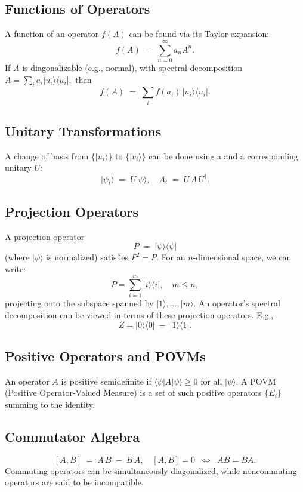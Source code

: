 \documentclass{article}
\begin{document}
\subsection{Functions of Operators}
A function of an operator \(f(A)\) can be found via its Taylor expansion:
\[
f(A) \;=\; \sum_{n=0}^\infty a_n A^n.
\]
If \(A\) is diagonalizable (e.g., normal), with spectral decomposition
\(
A = \sum_i a_i \lvert u_i\rangle \langle u_i\rvert,
\)
then
\[
f(A) \;=\; \sum_i f(a_i)\,\lvert u_i\rangle \langle u_i\rvert.
\]

\subsection{Unitary Transformations}
A change of basis from \(\{|u_i\rangle\}\) to \(\{|v_i\rangle\}\) can be done using a and a corresponding unitary \(U\):
\[
\lvert \psi_t\rangle \;=\; U \lvert \psi\rangle,
\quad
A_t \;=\; U\,A\,U^\dagger.
\]

\subsection{Projection Operators}
A projection operator
\[
P \;=\; \lvert \psi\rangle \langle \psi\rvert
\]
(where \(\lvert \psi\rangle\) is normalized) satisfies \(P^2=P\). For an \(n\)-dimensional space, we can write:
\[
P = \sum_{i=1}^m \lvert i\rangle\langle i\rvert,\quad m \le n,
\]
projecting onto the subspace spanned by \(\lvert 1\rangle, \dots, \lvert m\rangle\).  An operator's spectral decomposition can be viewed in terms of these projection operators.  E.g., 
\[
Z = \lvert 0\rangle\langle 0\rvert \;-\; \lvert 1\rangle\langle 1\rvert.
\]

\subsection{Positive Operators and POVMs}
An operator \(A\) is positive semidefinite if \(\langle \psi \lvert A \lvert \psi\rangle \ge 0\) for all \(\lvert \psi\rangle\). A POVM (Positive Operator-Valued Measure) is a set of such positive operators \(\{E_i\}\) summing to the identity.

\subsection{Commutator Algebra}
\[
[A,B] \;=\; A\,B \;-\; B\,A, 
\quad
[A,B] = 0 \;\; \Longleftrightarrow \;\; AB=BA.
\]
Commuting operators can be simultaneously diagonalized, while noncommuting operators are said to be incompatible.
\end{document}
